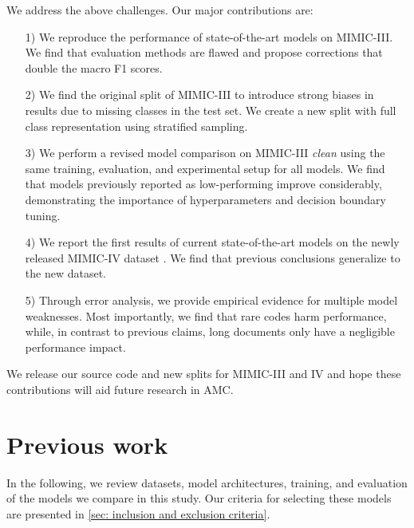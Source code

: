 \documentclass[anonymous=false, sigconf=true, review=false, natbib=true]{acmart}
\begin{document}
We address the above challenges. Our major contributions are:
\begin{itemize}[leftmargin=5mm]
\item[1)] We reproduce the performance of state-of-the-art models on MIMIC-III. We find that evaluation methods are flawed and propose corrections that double the macro F1 scores.
    \item[2)] We find the original split of MIMIC-III to introduce strong biases in results due to missing classes in the test set. We create a new split with full class representation using stratified sampling.
    \item [3)] We perform a revised model comparison on MIMIC-III \textit{clean} using the same training, evaluation, and experimental setup for all models. We find that models previously reported as low-performing improve considerably, demonstrating the importance of hyperparameters and decision boundary tuning.
    \item[4)] We report the first results of current state-of-the-art models on the newly released MIMIC-IV dataset \cite{johnsonMIMICIVFreelyAccessible2023, goldbergerPhysioBankPhysioToolkitPhysioNet2000}. We find that previous conclusions generalize to the new dataset.
    \item[5)] Through error analysis, we provide empirical evidence for multiple model weaknesses. Most importantly, we find that rare codes harm performance, while, in contrast to previous claims, long documents only have a negligible performance impact.
  
\end{itemize}
We release our source code and new splits for MIMIC-III and IV
and hope these contributions will aid future research in AMC.









\section{Previous work}

In the following, we review datasets, model architectures, training, and evaluation of the models we compare in this study. Our criteria for selecting these models are presented in \cref{sec: inclusion and exclusion criteria}.
\end{document}
